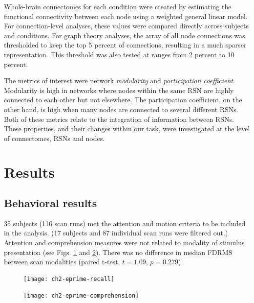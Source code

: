 Whole-brain connectomes for each condition were created by estimating the functional connectivity between each node using a weighted general linear model. For connection-level analyses, these values were compared directly across subjects and conditions. For graph theory analyses, the array of all node connections was thresholded to keep the top 5 percent of connections, resulting in a much sparser representation. This threshold was also tested at ranges from 2 percent to 10 percent.

The metrics of interest were network \textit{modularity} and \textit{participation coefficient}. Modularity is high in networks where nodes within the same RSN are highly connected to each other but not elsewhere. The participation coefficient, on the other hand, is high when many nodes are connected to several different RSNs. Both of these metrics relate to the integration of information between RSNs. These properties, and their changes within our task, were investigated at the level of connectomes, RSNs and nodes. 


\section{Results}

\subsection{Behavioral results}

35 subjects (116 scan runs) met the attention and motion criteria to be included in the analysis. (17 subjects and 87 individual scan runs were filtered out.) Attention and comprehension measures were not related to modality of stimulus presentation (see Figs. \ref{fig:ch2-eprime-recall} and \ref{fig:ch2-eprime-comprehension}). There was no difference in median FDRMS between scan modalities (paired t-test, $t = 1.09$, $p = 0.279$).  

\begin{figure}[tp]
	\centering
	\texttt{[image: ch2-eprime-recall]}
    \caption[Out-of-scanner pasage recall was unrelated to modality.]{}
	\label{fig:ch2-eprime-recall}
\end{figure}

\begin{figure}[tp]
	\centering
	\texttt{[image: ch2-eprime-comprehension]}
    \caption[In-scanner comprehension performance did not differ by modality.]{}
	\label{fig:ch2-eprime-comprehension}
\end{figure}


